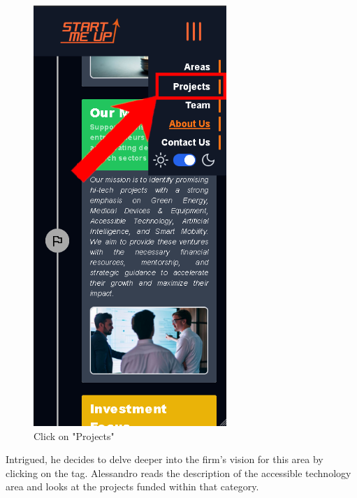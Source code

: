 \documentclass[11pt, letterpaper]{article}
\begin{document}
\begin{figure}[H]
\begin{minipage}[b]{0.4\textwidth}
    \includegraphics[width=7.3cm]{images/Scenarios/Scenario4/Screen6.png}
    \caption{Click on "Projects"}
    \label{fig:scenario4_6}
  \end{minipage}
\end{figure}
\noindent
Intrigued, he decides to delve deeper into the firm's vision for this area by clicking on the tag. Alessandro reads the description of the accessible technology area and looks at the projects funded within that category.
\end{document}
